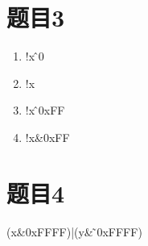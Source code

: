 \documentclass[12pt]{article}
\begin{document}
\section{题目3}

\begin{enumerate}[label*=(\alph*)]
    \item !x\,\^\,0
    \item !x
    \item !x\,\^\,0xFF
    \item !x\&0xFF
    
\end{enumerate}

\section{题目4}
(x\&0xFFFF)|(y\&\,\~\,0xFFFF)
\end{document}
